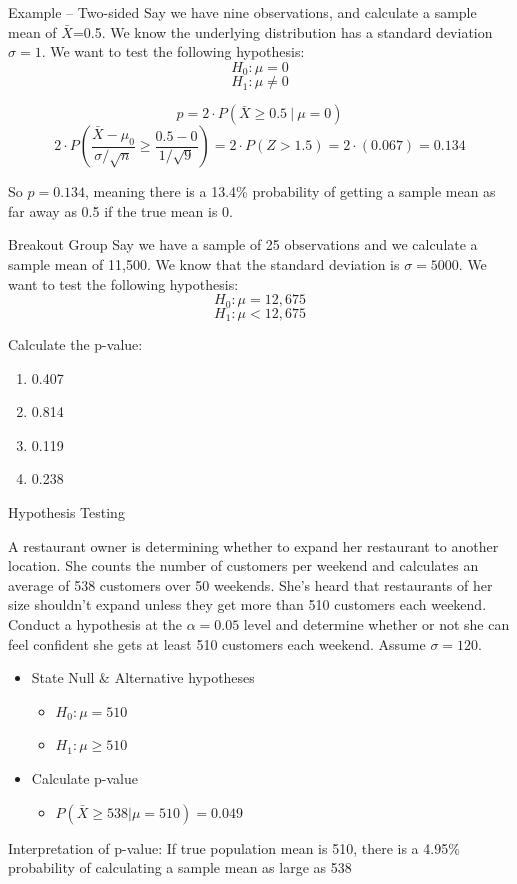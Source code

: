 \documentclass{beamer}
\begin{document}
\frame{}

\begin{frame}{Example -- Two-sided}
	Say we have nine observations, and calculate a sample mean of $\bar{X}$=0.5. We know the underlying distribution has a standard deviation $\sigma=1$. We want to test the following hypothesis:
	$$H_0: \mu=0$$
	$$H_1: \mu \neq 0$$
	
	$$p=2 \cdot P(\bar{X} \geq 0.5 \ \big| \ \mu=0)$$
	$$2 \cdot P(\frac{\bar{X}-\mu_0}{\sigma/\sqrt{n}}\geq \frac{0.5-0}{1/\sqrt{9}} )=2 \cdot P(Z>1.5)=2\cdot(0.067)=0.134$$
	
	So $p=0.134$, meaning there is a 13.4\% probability of getting a sample mean as far away as 0.5 if the true mean is 0.
\end{frame}



\begin{frame}{Breakout Group}
	Say we have a sample of 25 observations and we calculate a sample mean of 11,500. We know that the standard deviation is $\sigma=5000$. We want to test the following hypothesis:
	$$H_0: \mu=12,675$$
	$$H_1: \mu < 12,675$$
	
	Calculate the p-value:
	\begin{enumerate}[label=(\alph*)]
		\item 0.407
		\item 0.814
		\item 0.119
		\item 0.238
	\end{enumerate}
\end{frame}

\frame{}

\begin{frame}{Hypothesis Testing}
	\footnotesize{ A restaurant owner is determining whether to expand her restaurant to another location. She counts the number of customers per weekend and calculates an average of 538 customers over 50 weekends. She's heard that restaurants of her size shouldn't expand unless they get more than 510 customers each weekend. Conduct a hypothesis at the $\alpha=0.05$ level and determine whether or not she can feel confident she gets at least 510 customers each weekend. Assume $\sigma= 120$.
		\begin{itemize}
			\item State Null \& Alternative hypotheses
			\pause
			      \begin{itemize}
			      	\item $H_0: \mu=510$
			      	\item $H_1: \mu \geq 510$
			      \end{itemize}
			\item Calculate p-value
			\pause
			      \begin{itemize}
			      	\item $P(\bar{X} \geq 538 | \mu=510)=0.049$
			      \end{itemize}
		\end{itemize}}
	Interpretation of p-value: 
	\pause If true population mean is 510, there is a 4.95\% probability of calculating a sample mean as large as 538
\end{frame}
\end{document}
